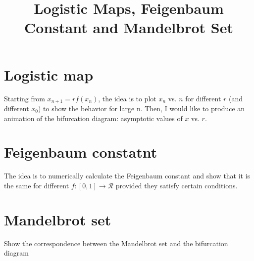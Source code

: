 \documentclass[a4paper,12pt]{article}
\title{Logistic Maps, Feigenbaum Constant and Mandelbrot Set}
\begin{document}
\maketitle
\section{Logistic map}
Starting from $x_{n+1}=rf(x_{n})$, the idea is to plot $x_{n}$ vs. $n$ for different $r$ (and different $x_{0}$) to show the behavior for large n. Then, I would like to produce an animation of the bifurcation diagram: asymptotic values of $x$ vs. $r$.
\section{Feigenbaum constatnt}
The idea is to numerically calculate the Feigenbaum constant and show that it is the same for different $f: [0,1] \rightarrow \mathcal{R}$ provided they satisfy certain conditions.
\section{ Mandelbrot set}
Show the correspondence between the Mandelbrot set and the bifurcation diagram
\end{document}
